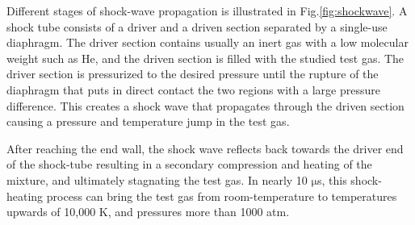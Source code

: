 Different stages of shock-wave propagation is illustrated in Fig.\ref{fig:shockwave}. A shock tube consists of a driver and a driven section separated by a single-use diaphragm. The driver section contains usually an inert gas with a low molecular weight such as He, and the driven section is filled with the studied test gas. The driver section is pressurized to the desired pressure until the rupture of the diaphragm that puts in direct contact the two regions with a large pressure difference. This creates a shock wave that propagates through the driven section causing a pressure and temperature jump in the test gas. 

After reaching the end wall, the shock wave reflects back towards the driver end of the shock-tube resulting in a secondary compression and heating of the mixture, and ultimately stagnating the test gas. In nearly 10 $\mathrm{\mu}$s, this shock-heating process can bring the test gas from room-temperature to temperatures upwards of 10,000 K, and pressures more than 1000 atm.




